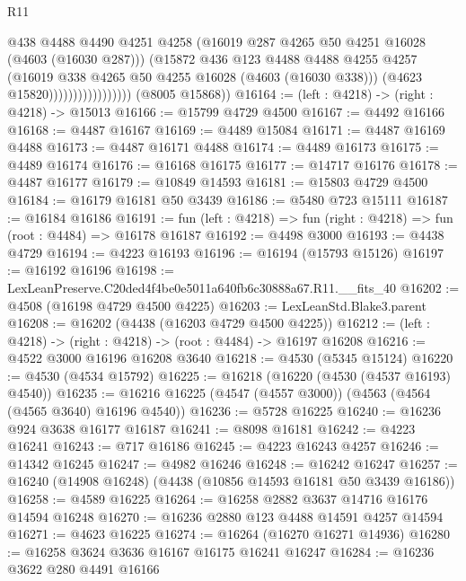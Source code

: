 \begin{lexlean}{R11}
\begin{coremodule}
                                    @438
                                    @4488
                                    @4490
                                    @4251
                                    @4258
                                    (@16019 @287 @4265 @50 @4251 @16028 (@4603 (@16030 @287)))
                                    (@15872
                                      @436
                                      @123
                                      @4488
                                      @4488
                                      @4255
                                      @4257
                                      (@16019 @338 @4265 @50 @4255 @16028 (@4603 (@16030 @338)))
                                      (@4623 @15820)))))))))))))))))
      (@8005 @15868))
@16164 := (left : @4218) -> (right : @4218) -> @15013
@16166 := @15799 @4729 @4500
@16167 := @4492 @16166
@16168 := @4487 @16167
@16169 := @4489 @15084
@16171 := @4487 @16169 @4488
@16173 := @4487 @16171 @4488
@16174 := @4489 @16173
@16175 := @4489 @16174
@16176 := @16168 @16175
@16177 := @14717 @16176
@16178 := @4487 @16177
@16179 := @10849 @14593
@16181 := @15803 @4729 @4500
@16184 := @16179 @16181 @50 @3439
@16186 := @5480 @723 @15111
@16187 := @16184 @16186
@16191 := fun (left : @4218) => fun (right : @4218) => fun (root : @4484) => @16178 @16187
@16192 := @4498 @3000
@16193 := @4438 @4729
@16194 := @4223 @16193
@16196 := @16194 (@15793 @15126)
@16197 := @16192 @16196
@16198 := LexLeanPreserve.C20ded4f4be0e5011a640fb6c30888a67.R11.__fits_40
@16202 := @4508 (@16198 @4729 @4500 @4225)
@16203 := LexLeanStd.Blake3.parent
@16208 := @16202 (@4438 (@16203 @4729 @4500 @4225))
@16212 := (left : @4218) -> (right : @4218) -> (root : @4484) -> @16197 @16208
@16216 := @4522 @3000 @16196 @16208 @3640
@16218 := @4530 (@5345 @15124)
@16220 := @4530 (@4534 @15792)
@16225 := @16218 (@16220 (@4530 (@4537 @16193) @4540))
@16235 := @16216 @16225 (@4547 (@4557 @3000)) (@4563 (@4564 (@4565 @3640) @16196 @4540))
@16236 := @5728 @16225
@16240 := @16236 @924 @3638 @16177 @16187
@16241 := @8098 @16181
@16242 := @4223 @16241
@16243 := @717 @16186
@16245 := @4223 @16243 @4257
@16246 := @14342 @16245
@16247 := @4982 @16246
@16248 := @16242 @16247
@16257 := @16240 (@14908 @16248) (@4438 (@10856 @14593 @16181 @50 @3439 @16186))
@16258 := @4589 @16225
@16264 := @16258 @2882 @3637 @14716 @16176 @14594 @16248
@16270 := @16236 @2880 @123 @4488 @14591 @4257 @14594
@16271 := @4623 @16225
@16274 := @16264 (@16270 @16271 @14936)
@16280 := @16258 @3624 @3636 @16167 @16175 @16241 @16247
@16284 := @16236 @3622 @280 @4491 @16166

\end{coremodule}
\end{lexlean}
